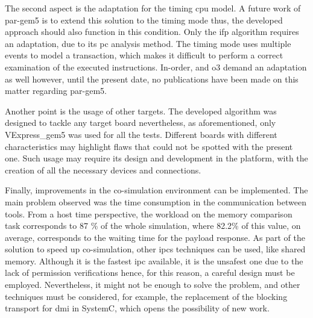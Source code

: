 The second aspect is the adaptation for the timing \gls{cpu} model. A future work of par-gem5 \cite{pargem5} is to extend this solution 
to the timing mode thus, the developed approach should also function in this condition. Only the \gls{ifp} algorithm requires an 
adaptation, due to its \gls{pc} analysis method. The timing mode uses multiple events to model a transaction, which makes it difficult
to perform a correct examination of the executed instructions. In-order, and \gls{o3} demand an adaptation as well however, until 
the present date, no publications have been made on this matter regarding par-gem5.

Another point is the usage of other targets. The developed algorithm was designed to tackle any target board nevertheless, as 
aforementioned, only VExpress\_gem5 was used for all the tests. Different boards with different characteristics may highlight flaws
that could not be spotted with the present one. Such usage may require its design and development in the platform, 
with the creation of all the necessary devices and connections. 

Finally, improvements in the co-simulation environment can be implemented. The main problem observed was the time consumption in the 
communication between tools. From a host time perspective, the workload on the memory comparison task corresponds to 87 \% of the 
whole simulation, where 82.2\% of this value, on average, corresponds to the waiting time for the payload response. As part of the solution
to speed up co-simulation, other \glspl*{ipc} techniques can be used, like shared memory. Although it is the 
fastest \gls{ipc} available, it is the unsafest one due to the lack of permission verifications hence, for this reason, a careful 
design must be employed. Nevertheless, it might not be enough to solve the problem, and other techniques must be considered, for example, 
the replacement of the blocking transport for \gls{dmi} in SystemC, which opens the possibility of new work. 

